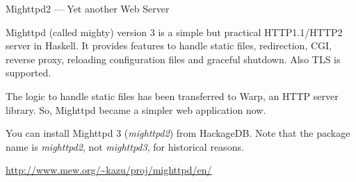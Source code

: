 \begin{hcarentry}[updated]{Mighttpd2 --- Yet another Web Server}
\label{mighttpd2}
\makeheader

Mighttpd (called mighty) version 3 is a simple but practical HTTP1.1/HTTP2 server in Haskell.
It provides features to handle static files, redirection, CGI, reverse proxy, reloading
configuration files and graceful shutdown. Also TLS is supported.

The logic to handle static files has been transferred to Warp, an HTTP server library. So, Mighttpd became a simpler web application now.

You can install Mighttpd 3 ({\it mighttpd2}) from HackageDB. Note that the package name
is {\it mighttpd2}, not {\it mighttpd3}, for historical reasons.

\FurtherReading
\begin{compactitem}
\item \url{http://www.mew.org/~kazu/proj/mighttpd/en/}
\end{compactitem}
\end{hcarentry}
